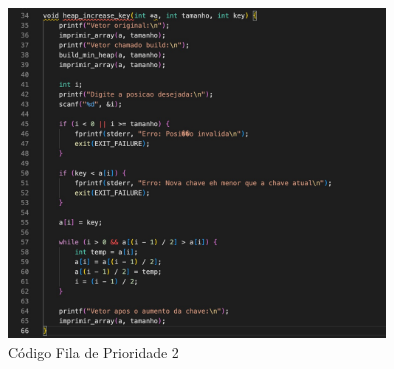 \begin{figure}[H]
    \centering
    \includegraphics[width = 10cm]{Imagens/fila/5f8a8050-b74b-4d6d-8770-07522b37a09a.jpg}
    \caption{Código Fila de Prioridade 2}
    \label{grafico_insert}
\end{figure}